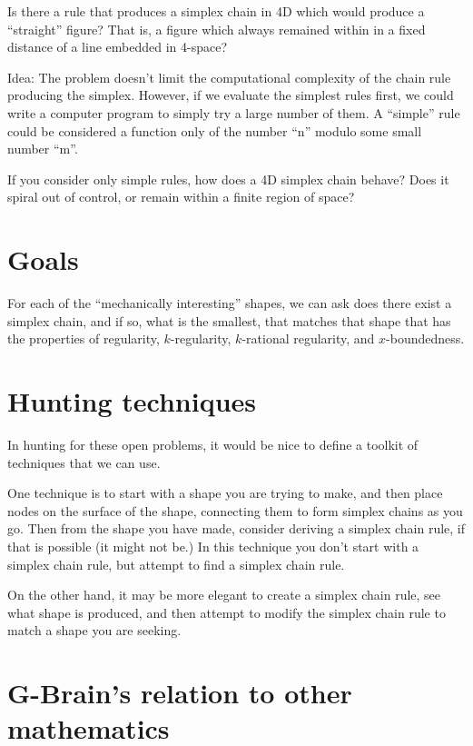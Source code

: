 \documentclass[11pt]{article}
\begin{document}
Is there a rule that produces a simplex chain in 4D which would produce a ``straight'' figure?
That is, a figure which always remained within in a fixed distance of a line embedded in 4-space?

Idea: The problem doesn't limit the computational complexity of the chain rule producing the simplex.
However, if we evaluate the simplest rules first, we could write a computer program to simply try a large number
of them. A ``simple'' rule could be considered a function only of the number ``n'' modulo some small number ``m''.

If you consider only simple rules, how does a 4D simplex chain behave? Does it spiral out of control, or remain within
a finite region of space? 


\section{Goals}

For each of the ``mechanically interesting'' shapes, we can ask does there exist a simplex chain,
and if so, what is the smallest,
that matches that shape that has the properties of regularity, $k$-regularity, $k$-rational regularity, and $x$-boundedness. 

\section{Hunting techniques}

In hunting for these open problems, it would be nice to define a toolkit of techniques that we can use.

One technique is to start with a shape you are trying to make, and then place nodes on the surface of the shape,
connecting them to form simplex chains as you go. Then from the shape you have made, consider deriving a simplex chain rule,
if that is possible (it might not be.) In this technique you don't start with a simplex chain rule, but
attempt to find a simplex chain rule.

On the other hand, it may be more elegant to create a simplex chain rule, see what shape is produced,
and then attempt to modify the simplex chain rule to match a shape you are seeking.

\section{G-Brain's relation to other mathematics}
\end{document}
